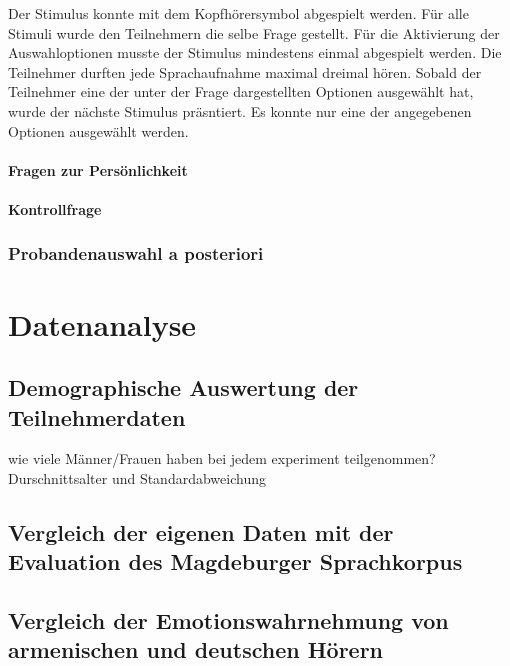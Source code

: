 \documentclass[11pt,a4paper,headsepline,twoside,toc=bibliography]{scrreprt}
\begin{document}
 Der Stimulus konnte mit dem Kopfhörersymbol abgespielt werden. Für alle Stimuli wurde den Teilnehmern die selbe Frage gestellt. Für die Aktivierung der Auswahloptionen musste der Stimulus mindestens einmal abgespielt werden. Die Teilnehmer durften jede Sprachaufnahme maximal dreimal hören. Sobald der Teilnehmer eine der unter der Frage dargestellten Optionen ausgewählt hat, wurde der nächste Stimulus präsntiert. Es konnte nur eine der angegebenen Optionen ausgewählt werden.
 
\subsubsection{Fragen zur Persönlichkeit}

\subsubsection{Kontrollfrage}

\subsection{Probandenauswahl a posteriori}


 
\chapter{Datenanalyse}

\section{Demographische Auswertung der Teilnehmerdaten}

wie viele Männer/Frauen haben bei jedem experiment teilgenommen? 
Durschnittsalter und Standardabweichung


\section{Vergleich der eigenen Daten mit der Evaluation des Magdeburger Sprachkorpus}

\section{Vergleich der Emotionswahrnehmung von armenischen und deutschen Hörern}
\end{document}
